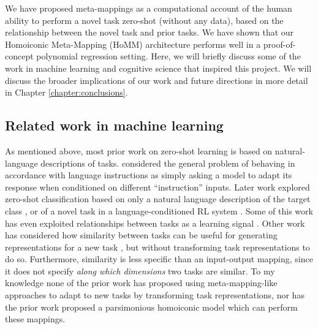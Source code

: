 We have proposed meta-mappings as a computational account of the human ability to perform a novel task zero-shot (without any data), based on the relationship between the novel task and prior tasks. We have shown that our Homoiconic Meta-Mapping (HoMM) architecture performs well in a proof-of-concept polynomial regression setting. Here, we will briefly discuss some of the work in machine learning and cognitive science that inspired this project. We will discuss the broader implications of our work and future directions in more detail in Chapter \ref{chapter:conclusions}. 

\subsection{Related work in machine learning}
As mentioned above, most prior work on zero-shot learning is based on natural-language descriptions of tasks. \citet{Larochelle2008} considered the general problem of behaving in accordance with language instructions as simply asking a model to adapt its response when conditioned on different ``instruction'' inputs. Later work explored zero-shot classification based on only a natural language description of the target class \citep{Socher2013,Romera-Paredes2015,Xian2018}, or of a novel task in a language-conditioned RL system \citep{Hermann2017, Hill2019a}. Some of this work has even exploited relationships between tasks as a learning signal \citep{Oh2017a}. Other work has considered how similarity between tasks can be useful for generating representations for a new task \citep{Pal2019}, but without transforming task representations to do so. Furthermore, similarity is less specific than an input-output mapping, since it does not specify \emph{along which dimensions} two tasks are similar. To my knowledge none of the prior work has proposed using meta-mapping-like approaches to adapt to new tasks by transforming task representations, nor has the prior work proposed a parsimonious homoiconic model which can perform these mappings.

